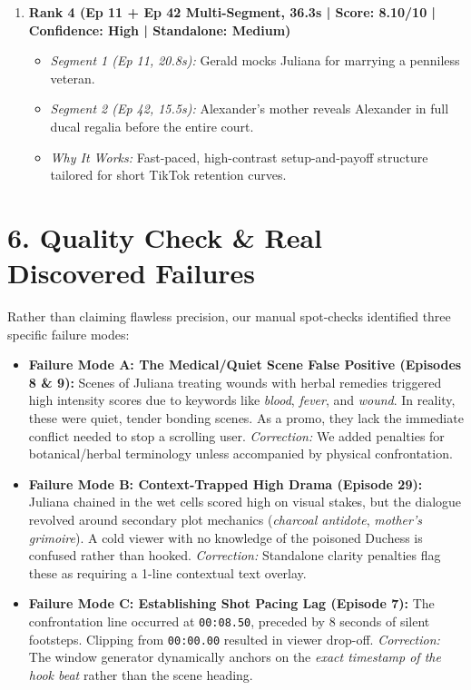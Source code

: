 \documentclass[10pt,a4paper]{article}
\begin{document}
\begin{enumerate}[leftmargin=1.2em]
\begin{itemize}
    \end{itemize}
    \item \textbf{Rank 4 (Ep 11 + Ep 42 Multi-Segment, 36.3s | Score: 8.10/10 | Confidence: High | Standalone: Medium)}
    \begin{itemize}
        \item \textit{Segment 1 (Ep 11, 20.8s):} Gerald mocks Juliana for marrying a penniless veteran.
        \item \textit{Segment 2 (Ep 42, 15.5s):} Alexander's mother reveals Alexander in full ducal regalia before the entire court.
        \item \textit{Why It Works:} Fast-paced, high-contrast setup-and-payoff structure tailored for short TikTok retention curves.
    \end{itemize}
\end{enumerate}

\section*{6. Quality Check \& Real Discovered Failures}
Rather than claiming flawless precision, our manual spot-checks identified three specific failure modes:
\begin{itemize}[leftmargin=1.2em]
    \item \textbf{Failure Mode A: The Medical/Quiet Scene False Positive (Episodes 8 \& 9):}
    Scenes of Juliana treating wounds with herbal remedies triggered high intensity scores due to keywords like \textit{blood}, \textit{fever}, and \textit{wound}. In reality, these were quiet, tender bonding scenes. As a promo, they lack the immediate conflict needed to stop a scrolling user. \textit{Correction:} We added penalties for botanical/herbal terminology unless accompanied by physical confrontation.
    \item \textbf{Failure Mode B: Context-Trapped High Drama (Episode 29):}
    Juliana chained in the wet cells scored high on visual stakes, but the dialogue revolved around secondary plot mechanics (\textit{charcoal antidote}, \textit{mother's grimoire}). A cold viewer with no knowledge of the poisoned Duchess is confused rather than hooked. \textit{Correction:} Standalone clarity penalties flag these as requiring a 1-line contextual text overlay.
    \item \textbf{Failure Mode C: Establishing Shot Pacing Lag (Episode 7):}
    The confrontation line occurred at \texttt{00:08.50}, preceded by 8 seconds of silent footsteps. Clipping from \texttt{00:00.00} resulted in viewer drop-off. \textit{Correction:} The window generator dynamically anchors on the \textit{exact timestamp of the hook beat} rather than the scene heading.
\end{itemize}
\end{document}
